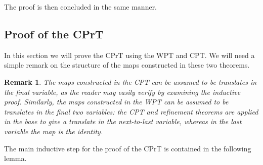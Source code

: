 \documentclass[reqno]{amsart}
\newtheorem{Rem}[Cor]{Remark}{\scshape}{\rmfamily}
\renewcommand\~[1]{\widetilde{#1}}
\begin{document}
The proof is then concluded in the same manner.

\subsection{Proof of the CPrT}

In this section we will prove the CPrT using the WPT and CPT. We will
need a simple remark on the structure of the maps constructed in these
two theorems.

\begin{Rem}\label{rem:wpt-cpt-translates}
  The maps constructed in the CPT can be assumed to be translates in
  the final variable, as the reader may easily verify by examining the
  inductive proof. Similarly, the maps constructed in the WPT can be
  assumed to be translates in the final two variables: the CPT and
  refinement theorems are applied in the base to give a translate in
  the next-to-last variable, whereas in the last variable the map is
  the identity.
\end{Rem}

The main inductive step for the proof of the CPrT is contained in the
following lemma.
\end{document}
